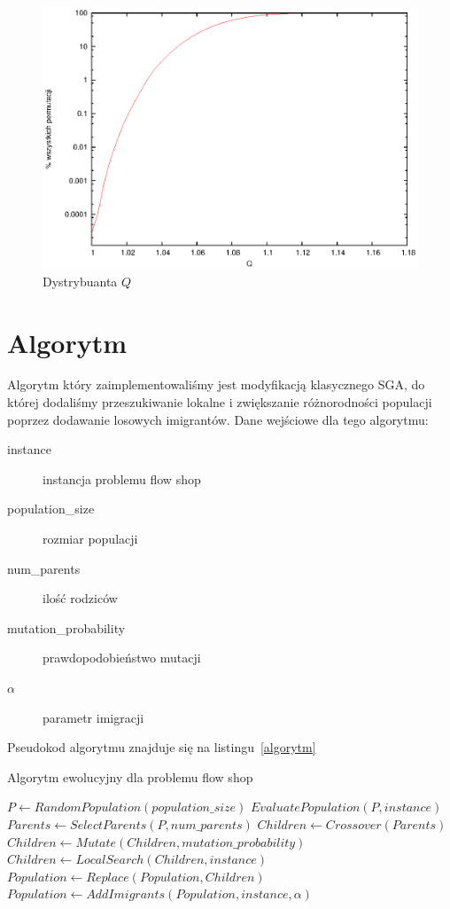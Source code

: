 \documentclass[11pt, a4wide]{article}
\begin{document}
\begin{figure}[H]
\caption{Dystrybuanta $Q$}
\label{dystrybuanta}
\begin{center}
  \includegraphics{dystrybuanta.eps}
\end{center}
\end{figure}




\section{Algorytm}
Algorytm który zaimplementowaliśmy jest modyfikacją klasycznego SGA, do której dodaliśmy przeszukiwanie lokalne
i zwiększanie różnorodności populacji poprzez dodawanie losowych imigrantów. Dane wejściowe dla tego algorytmu:
\begin{description}
  \item[instance] instancja problemu flow shop
  \item[population\_size] rozmiar populacji
  \item[num\_parents] ilość rodziców
  \item[mutation\_probability] prawdopodobieństwo mutacji
  \item[$\alpha$] parametr imigracji
\end{description}
Pseudokod algorytmu znajduje się na listingu~\ref{algorytm}

\begin{algorithm}[H]
\caption{Algorytm ewolucyjny dla problemu flow shop}
\label{algorytm}
\begin{algorithmic}
  \State $P \gets RandomPopulation(population\_size)$
  \State $EvaluatePopulation(P, instance)$
    \State $Parents \gets SelectParents(P, num\_parents)$ 
    \State $Children \gets Crossover(Parents)$
    \State $Children \gets Mutate(Children, mutation\_probability)$
    \State $Children \gets LocalSearch(Children, instance)$
    \State $Population \gets Replace(Population, Children)$
    \State $Population \gets AddImigrants(Population, instance, \alpha)$
  \EndWhile
\end{algorithmic}
\end{algorithm}
\end{document}
